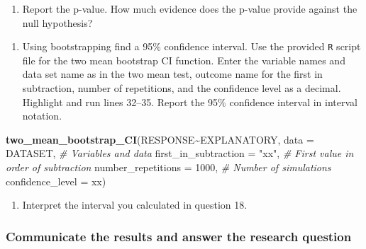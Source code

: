 \documentclass[
]{report}
\newenvironment{Shaded}{\begin{snugshade}}{\end{snugshade}}
\newcommand{\CommentTok}[1]{\textcolor[rgb]{0.56,0.35,0.01}{\textit{#1}}}
\newcommand{\DataTypeTok}[1]{\textcolor[rgb]{0.13,0.29,0.53}{#1}}
\newcommand{\DecValTok}[1]{\textcolor[rgb]{0.00,0.00,0.81}{#1}}
\newcommand{\KeywordTok}[1]{\textcolor[rgb]{0.13,0.29,0.53}{\textbf{#1}}}
\newcommand{\NormalTok}[1]{#1}
\newcommand{\OperatorTok}[1]{\textcolor[rgb]{0.81,0.36,0.00}{\textbf{#1}}}
\newcommand{\StringTok}[1]{\textcolor[rgb]{0.31,0.60,0.02}{#1}}
\providecommand{\tightlist}{%
  \setlength{\itemsep}{0pt}\setlength{\parskip}{0pt}}
\begin{document}
\begin{enumerate}
\def\labelenumi{\arabic{enumi}.}
\setcounter{enumi}{16}
\tightlist
\item
  Report the p-value. How much evidence does the p-value provide against the null hypothesis?
\end{enumerate}

\vspace{0.5in}

\begin{enumerate}
\def\labelenumi{\arabic{enumi}.}
\setcounter{enumi}{17}
\tightlist
\item
  Using bootstrapping find a 95\% confidence interval. Use the provided \texttt{R} script file for the two mean bootstrap CI function. Enter the variable names and data set name as in the two mean test, outcome name for the first in subtraction, number of repetitions, and the confidence level as a decimal. Highlight and run lines 32--35. Report the 95\% confidence interval in interval notation.
\end{enumerate}

\begin{Shaded}
\begin{Highlighting}[]
\KeywordTok{two\_mean\_bootstrap\_CI}\NormalTok{(RESPONSE}\OperatorTok{\textasciitilde{}}\NormalTok{EXPLANATORY, }\DataTypeTok{data =}\NormalTok{ DATASET,  }\CommentTok{\# Variables and data}
                      \DataTypeTok{first\_in\_subtraction =} \StringTok{"xx"}\NormalTok{, }\CommentTok{\# First value in order of subtraction}
                      \DataTypeTok{number\_repetitions =} \DecValTok{1000}\NormalTok{,  }\CommentTok{\# Number of simulations}
                      \DataTypeTok{confidence\_level =}\NormalTok{ xx)}
\end{Highlighting}
\end{Shaded}

\vspace{0.3in}

\begin{enumerate}
\def\labelenumi{\arabic{enumi}.}
\setcounter{enumi}{18}
\tightlist
\item
  Interpret the interval you calculated in question 18.
\end{enumerate}

\vspace{1in}

\hypertarget{communicate-the-results-and-answer-the-research-question-2}{%
\subsubsection*{Communicate the results and answer the research question}\label{communicate-the-results-and-answer-the-research-question-2}}
\end{document}
